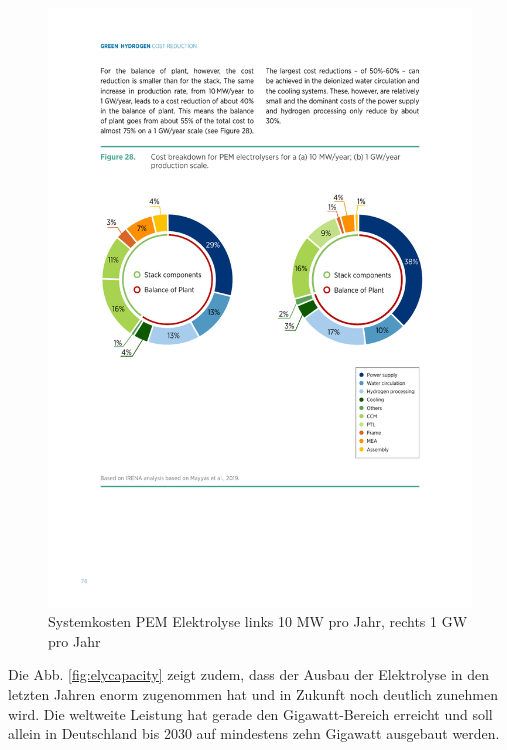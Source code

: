 	\begin{figure} 
		\centering
		\includegraphics[width=1\linewidth]{content/Grafiken/ElyCost}
		\caption[Systemkosten PEM Elektrolyse]{Systemkosten \gls{PEM} Elektrolyse links 10 MW pro Jahr, rechts 1 GW pro Jahr \cite{IRENA2020}}
		\label{fig:elycost}
	\end{figure}
Die Abb. \ref{fig:elycapacity} zeigt zudem, dass der Ausbau der Elektrolyse in den letzten Jahren enorm zugenommen hat und in Zukunft noch deutlich zunehmen wird. Die weltweite Leistung hat gerade den Gigawatt-Bereich erreicht und soll allein in Deutschland bis 2030 auf mindestens zehn Gigawatt ausgebaut werden.\\

